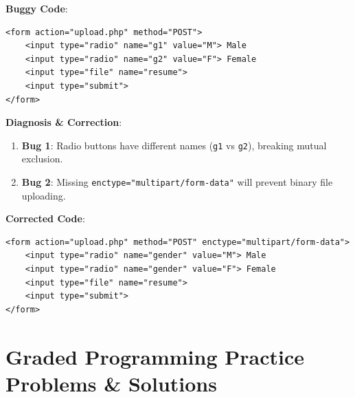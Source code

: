 \begin{debuggingbox}
\textbf{Buggy Code}:
\begin{lstlisting}[language=HTML5]
<form action="upload.php" method="POST">
    <input type="radio" name="g1" value="M"> Male
    <input type="radio" name="g2" value="F"> Female
    <input type="file" name="resume">
    <input type="submit">
</form>
\end{lstlisting}
\textbf{Diagnosis \& Correction}:
\begin{enumerate}
    \item \textbf{Bug 1}: Radio buttons have different names (\texttt{g1} vs \texttt{g2}), breaking mutual exclusion.
    \item \textbf{Bug 2}: Missing \texttt{enctype="multipart/form-data"} will prevent binary file uploading.
\end{enumerate}
\textbf{Corrected Code}:
\begin{lstlisting}[language=HTML5]
<form action="upload.php" method="POST" enctype="multipart/form-data">
    <input type="radio" name="gender" value="M"> Male
    <input type="radio" name="gender" value="F"> Female
    <input type="file" name="resume">
    <input type="submit">
</form>
\end{lstlisting}
\end{debuggingbox}

\section{Graded Programming Practice Problems \& Solutions}

